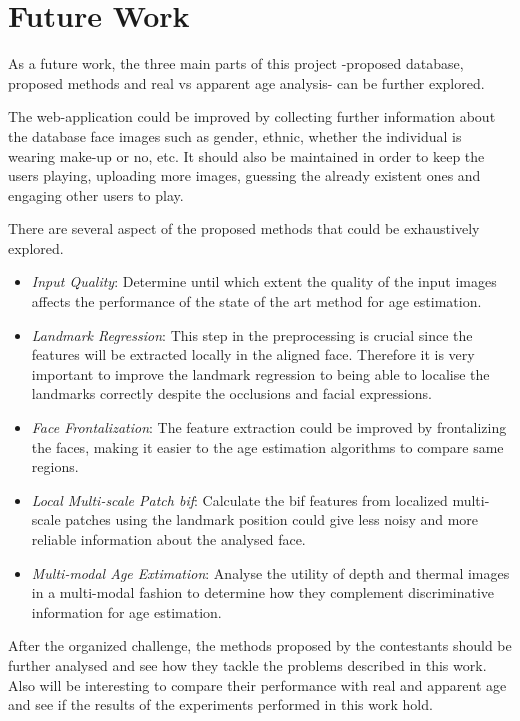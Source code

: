 \section{Future Work}

As a future work, the three main parts of this project -proposed database, proposed methods and real vs apparent age analysis- can be further explored.

The web-application could be improved by collecting further information about the database face images such as gender, ethnic, whether the individual is wearing make-up or no, etc. It should also be maintained in order to keep the users playing, uploading more images, guessing the already existent ones and engaging other users to play.

There are several aspect of the proposed methods that could be exhaustively explored.

\begin{itemize}
	\item \textit{Input Quality}: Determine until which extent the quality of the input images affects the performance of the state of the art method for age estimation.
	
	\item \textit{Landmark Regression}: This step in the preprocessing is crucial since the features will be extracted locally in the aligned face. Therefore it is very important to improve the landmark regression to being able to localise the landmarks correctly despite the occlusions and facial expressions.
	
	\item \textit{Face Frontalization}: The feature extraction could be improved by frontalizing the faces, making it easier to the age estimation algorithms to compare same regions.
	
	\item \textit{Local Multi-scale Patch \gls{bif}}: Calculate the \gls{bif} features from localized multi-scale patches using the landmark position could give less noisy and more reliable information about the analysed face.
	
	\item \textit{Multi-modal Age Extimation}: Analyse the utility of depth and thermal images in a multi-modal fashion to determine how they complement discriminative information for age estimation.
\end{itemize}

After the organized challenge, the methods proposed by the contestants should be further analysed and see how they tackle the problems described in this work. Also will be interesting to compare their performance with real and apparent age and see if the results of the experiments performed in this work hold.


